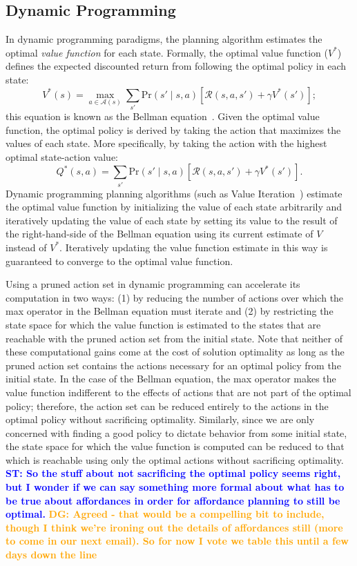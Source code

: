 \documentclass[]{article}
\newcommand{\stnote}[1]{\textcolor{Blue}{\textbf{ST: #1}}}
\newcommand{\dgnote}[1]{\textcolor{Orange}{\textbf{DG: #1}}}
\begin{document}
\subsection{Dynamic Programming}
In dynamic programming paradigms, the planning algorithm estimates the
optimal {\em value function} for each state. Formally, the optimal
value function ($V^*$) defines the expected discounted return from
following the optimal policy in each state:
\begin{equation}
\label{eq:bellman}
V^*(s) = \max_{a \in \mathcal{A}(s)} \sum_{s'} \text{Pr}(s' \mid s, a)\left[\mathcal{R}(s,a,s') + \gamma V^*(s') \right];
\end{equation}
this equation is known as the Bellman
equation~\citep{bellman57}. Given the optimal value function, the
optimal policy is derived by taking the action that maximizes the
values of each state. More specifically, by taking the action with the
highest optimal state-action value:
\begin{equation}
\label{eq:qvalue}
Q^*(s,a) = \sum_{s'} \text{Pr}(s' \mid s, a)\left[\mathcal{R}(s,a,s') + \gamma V^*(s') \right].
\end{equation}
Dynamic programming planning algorithms (such as Value
Iteration~\citep{bellman57}) estimate the optimal value function by
initializing the value of each state arbitrarily and iteratively
updating the value of each state by setting its value to the result of
the right-hand-side of the Bellman equation using its current estimate
of $V$ instead of $V^*$. Iteratively updating the value function
estimate in this way is guaranteed to converge to the optimal value
function.

Using a pruned action set in dynamic programming can accelerate its
computation in two ways: (1) by reducing the number of actions over
which the max operator in the Bellman equation must iterate and (2) by
restricting the state space for which the value function is estimated
to the states that are reachable with the pruned action set from the
initial state. Note that neither of these computational gains come at
the cost of solution optimality as long as the pruned action set
contains the actions necessary for an optimal policy from the initial
state. In the case of the Bellman equation, the max operator makes the
value function indifferent to the effects of actions that are not part
of the optimal policy; therefore, the action set can be reduced
entirely to the actions in the optimal policy without sacrificing
optimality. Similarly, since we are only concerned with finding a good
policy to dictate behavior from some initial state, the state space
for which the value function is computed can be reduced to that which
is reachable using only the optimal actions without sacrificing
optimality.  
\stnote{So the stuff about not sacrificing the optimal
  policy seems right, but I wonder if we can say something more formal
  about what has to be true about affordances in order for affordance
  planning to still be optimal.}
\dgnote{Agreed - that would be a compelling bit to include, though I think
we're ironing out the details of affordances still (more to come in our next email). So
for now I vote we table this until a few days down the line}
\end{document}
